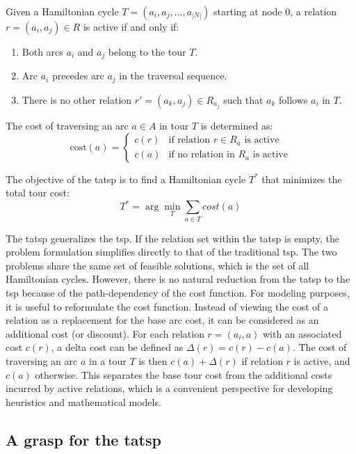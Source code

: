 \documentclass[twocolumn, switch]{article} %
\begin{document}
Given a Hamiltonian cycle $T = (a_i, a_j, \ldots, a_{|N|})$ starting at node $0$, a relation $r = (a_i, a_j) \in R$ is active if and only if:
\begin{enumerate}
\item Both arcs $a_i$ and $a_j$ belong to the tour $T$.
\item Arc $a_i$ precedes arc $a_j$ in the traversal sequence.
\item There is no other relation $r' = (a_k, a_j) \in R_{a_j}$ such that $a_k$ follows $a_i$ in $T$.
\end{enumerate}

The cost of traversing an arc $a \in A$ in tour $T$ is determined as:
\begin{equation}
\text{cost}(a) = \begin{cases}
c(r) & \text{if relation } r \in R_a \text{ is active} \\
c(a) & \text{if no relation in } R_a \text{ is active}
\end{cases}
\end{equation}

The objective of the \gls{tatsp} is to find a Hamiltonian cycle $T^*$ that minimizes the total tour cost:
\begin{equation}
T^* = \arg\min_{T} \sum_{a \in T} cost(a)
\end{equation}

The \gls{tatsp} generalizes the \gls{tsp}. If the relation set within the \gls{tatsp} is empty, 
the problem formulation simplifies directly to that of the traditional \gls{tsp}.
The two problems share the same set of feasible solutions, which is the set of all Hamiltonian cycles.
However, there is no natural reduction from the \gls{tatsp} to the \gls{tsp} because of the path-dependency of the cost function.
For modeling purposes, it is useful to reformulate the cost function. Instead of viewing the cost of a relation as a replacement for the base arc cost, it can be considered as an additional cost (or discount). For each relation $r = (a_i, a)$ with an associated cost $c(r)$, a delta cost can be defined as $\Delta(r) = c(r) - c(a)$. The cost of traversing an arc $a$ in a tour $T$ is then $c(a) + \Delta(r)$ if relation $r$ is active, and $c(a)$ otherwise. This separates the base tour cost from the additional costs incurred by active relations, which is a convenient perspective for developing heuristics and mathematical models.

\subsection{A \gls{grasp} for the \gls{tatsp}}
\end{document}

